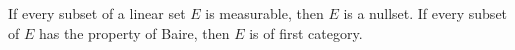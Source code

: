 If every subset of a linear set $E$ is measurable, then $E$ is a nullset. If every subset of $E$ has the property of Baire, then $E$ is of first category.
